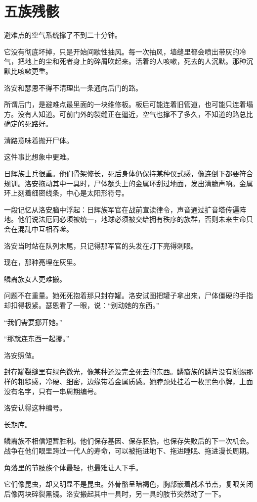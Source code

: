 \chapter{五族残骸}

避难点的空气系统撑了不到二十分钟。

它没有彻底坏掉，只是开始间歇性抽风。每一次抽风，墙缝里都会喷出带灰的冷气，把地上的尘和死者身上的碎屑吹起来。活着的人咳嗽，死去的人沉默。那种沉默比咳嗽更重。

洛安和瑟恩不得不清理出一条通向后门的路。

所谓后门，是避难点最里面的一块维修板。板后可能连着旧管道，也可能只连着塌方。没有人知道。可前门外的裂缝正在逼近，空气也撑不了多久，不知道的路总比确定的死路好。

清路意味着搬开尸体。

这件事比想象中更难。

日辉族士兵很重。他们骨架修长，死后身体仍保持某种仪式感，像连倒下都要符合规训。洛安拖动其中一具时，尸体额头上的金属环刮过地面，发出清脆声响。金属环上刻着细密线条，中心是太阳形符号。

一段记忆从洛安脑中浮起：日辉族军官在战前宣读律令，声音通过扩音塔传遍阵地。他们说法厄同必须被统一，地球必须被交给拥有秩序的族群，否则未来生命只会在混乱中互相吞噬。

洛安当时站在队列末尾，只记得那军官的头发在灯下亮得刺眼。

现在，那种亮埋在灰里。

鳞裔族女人更难搬。

问题不在重量。她死死抱着那只封存罐。洛安试图把罐子拿出来，尸体僵硬的手指却扣得极紧。瑟恩看了一眼，说：“别动她的东西。”

“我们需要挪开她。”

“那就连东西一起挪。”

洛安照做。

封存罐裂缝里有绿色微光，像某种还没完全死去的东西。鳞裔族的鳞片没有蜥蜴那样的粗糙感，冷硬、细密，边缘带着金属质感。她脖颈处挂着一枚黑色小牌，上面没有名字，只有一串周期编号。

洛安认得这种编号。

长期库。

鳞裔族不相信短暂胜利。他们保存基因、保存胚胎，也保存失败后的下一次机会。战争在他们眼里跨过一代人的寿命，可以被拖进地下、拖进睡眠、拖进漫长周期。

角落里的节肢族个体最轻，也最难让人下手。

它们像昆虫，却又明显不是昆虫。外骨骼呈暗褐色，胸部嵌着战术节点，复眼关闭后像两块碎裂黑镜。洛安搬起其中一具时，另一具的肢节突然动了一下。

